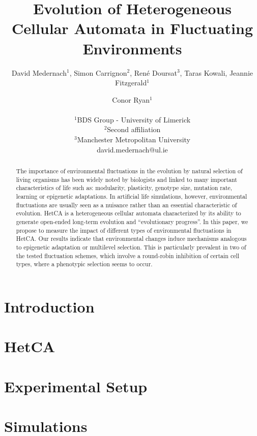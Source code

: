 \documentclass[letterpaper]{article}
\title{Evolution of Heterogeneous Cellular Automata in Fluctuating Environments}
\author{David Medernach$^{1}$, Simon Carrignon$^{2}$, René Doursat$^{3}$, Taras Kowali, Jeannie Fitzgerald$^1$ \and Conor Ryan$^1$ \\
\mbox{}\\
$^1$BDS Group - University of Limerick  \\
$^2$Second affiliation \\
$^3$Manchester Metropolitan University \\
david.medernach@ul.ie}
\begin{document}
\maketitle

\begin{abstract}
The importance of environmental fluctuations in the evolution by natural selection of living organisms has been widely noted by biologists and linked to many important characteristics of life such as: modularity, plasticity, genotype size, mutation rate, learning or epigenetic adaptations. In artificial life simulations, however, environmental fluctuations are usually seen as a nuisance rather than an essential characteristic of evolution. HetCA is a heterogeneous cellular automata characterized by its ability to generate open-ended long-term evolution and ``evolutionary progress''. In this paper, we propose to measure the impact of different types of environmental fluctuations in HetCA. Our results indicate that environmental changes induce mechanisms analogous to epigenetic adaptation or multilevel selection. This is particularly prevalent in two of the tested fluctuation schemes, which involve a round-robin inhibition of certain cell types, where a phenotypic selection seems to occur.
\end{abstract}

\section{Introduction}\label{sec:intro}


%

\section{HetCA}\label{sec:hetca)}


\section{Experimental Setup}\label{sec:exsetup}


\section{Simulations}\label{sec:method}

\end{document}
